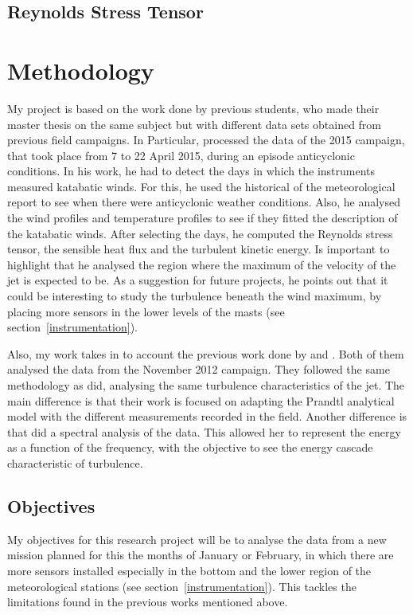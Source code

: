\documentclass[a4paper,12pt]{article}
\begin{document}
\subsection{Reynolds Stress Tensor}


\section{Methodology}
My project is based on the work done by previous students, who made their master thesis on the same subject but with different data sets obtained from previous field campaigns. In Particular, \cite{jakob} processed the data of the 2015 campaign, that took place from 7 to 22 April 2015, during an episode anticyclonic conditions. In his work, he had to detect the days in which the instruments measured katabatic winds. For this, he used the historical of the meteorological report to see when there were anticyclonic weather conditions. Also, he analysed the wind profiles and temperature profiles to see if they fitted the description of the katabatic winds. After selecting the days, he computed the Reynolds stress tensor, the sensible heat flux and the turbulent kinetic energy. Is important to highlight that he analysed the region where the maximum of the velocity of the jet is expected to be. As a suggestion for future projects, he points out that it could be interesting to study the turbulence beneath the wind maximum, by placing more sensors in the lower levels of the masts (see section~\ref{instrumentation}).

Also, my work takes in to account the previous work done by \cite{claudine} and \cite{alban}. Both of them analysed the data from the November 2012 campaign. They followed the same methodology as \citeauthor{jakob} did, analysing the same turbulence characteristics of the jet. The main difference is that their work is focused on adapting the Prandtl analytical model with the different measurements recorded in the field. Another difference is that \citeauthor{claudine} did a spectral analysis of the data. This allowed her to represent the energy as a function of the frequency, with the objective to see the energy cascade characteristic of turbulence. 

\subsection{Objectives}
My objectives for this research project will be to analyse the data from a new mission planned for this the months of January or February, in which there are more sensors installed especially in the bottom and the lower region of the meteorological stations (see section~\ref{instrumentation}). This tackles the limitations found in the previous works mentioned above. 
\end{document}
